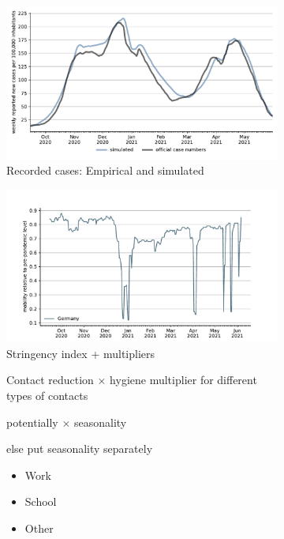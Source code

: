 \begin{figure}[!tp]
    \centering
    
    \begin{subfigure}[b]{0.475\textwidth}
        \centering

        \includegraphics[width=\textwidth]{../figures/results/figures/scenario_comparisons/combined_fit/full_new_known_case}
        \caption{{\small Recorded cases: Empirical and simulated}}
        \label{fig:aggregated_fit}
    \end{subfigure}
    \hfill
    \begin{subfigure}[b]{0.475\textwidth}
        \centering
        \includegraphics[width=\textwidth]{../figures/results/figures/data/work_multiplier_since_sep}
        Stringency index + multipliers

        Contact reduction $\times$ hygiene multiplier for different types of contacts 
        
        potentially $\times$ seasonality

        else put seasonality separately
        \begin{itemize}
            \item Work
            \item School
            \item Other
        \end{itemize}


\end{subfigure}
\end{figure}
